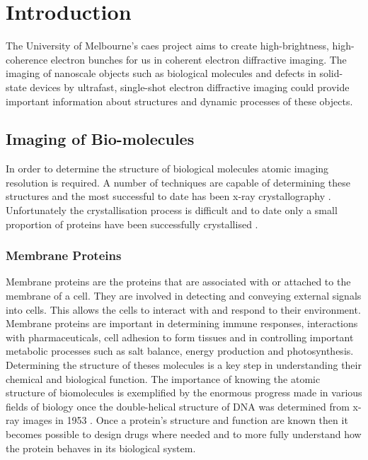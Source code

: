 \chapter{Introduction}

The University of Melbourne's \gls{caes} project aims to create high-brightness,  high-coherence electron bunches for us in coherent electron diffractive imaging. The imaging of nanoscale objects such as biological molecules \cite{dwyer_femtosecond_2006, williamson_clocking_1997} and defects in solid-state devices \cite{siwick_atomic-level_2003} by ultrafast, single-shot electron diffractive imaging could provide important information about structures and dynamic processes of these objects.

\section{Imaging of Bio-molecules}

In order to determine the structure of biological molecules atomic imaging resolution is required. A number of techniques are capable of determining these structures \cite{nettleship_methods_2008, svergun_small-angle_2003, opella_structure_2004} and the most successful to date has been x-ray crystallography \cite{kendrew_three-dimensional_1958, uson_advances_1999}. Unfortunately the crystallisation process is difficult and to date only a small proportion of proteins have been successfully crystallised \cite{geerlof_impact_2006}.

\subsection{Membrane Proteins}
Membrane proteins are the proteins that are associated with or attached to the membrane of a cell. They are involved in detecting and conveying external signals into cells. This allows the cells to interact with and respond to their environment\cite{almen_mapping_2009}. Membrane proteins are important in determining immune responses, interactions with pharmaceuticals, cell adhesion to form tissues and in controlling important metabolic processes such as salt balance, energy production and photosynthesis\cite{chiras_human_2011}. Determining the structure of theses molecules is a key step in understanding their chemical and biological function. The importance of knowing the atomic structure of biomolecules is exemplified by the enormous progress made in various fields of biology once the double-helical structure of DNA was determined from x-ray images in 1953 \cite{watson_molecular_1953}. Once a protein's structure and function are known then it becomes possible to design drugs \cite{pinto_influenza_1992} where needed and to more fully understand how the protein behaves in its biological system.

